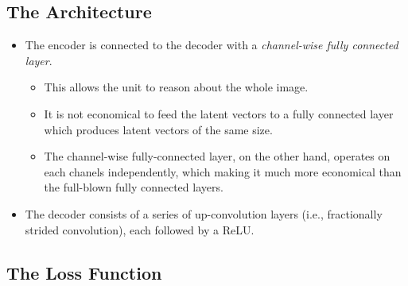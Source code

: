 \documentclass[10pt]{article}
\begin{document}
  \subsection{The Architecture}

  \begin{itemize}
  	
  	\item The encoder is connected to the decoder with a \emph{channel-wise fully connected layer}.
  	\begin{itemize}
  		\item This allows the unit to reason about the whole image.

  		\item It is not economical to feed the latent vectors to a fully connected layer which produces latent vectors of the same size. 

  		\item The channel-wise fully-connected layer, on the other hand, operates on each chanels independently, which making it much more economical than the full-blown fully connected layers.
  	\end{itemize}

  	\item The decoder consists of a series of up-convolution layers (i.e., fractionally strided convolution), each followed by a ReLU.	
  \end{itemize}

  \subsection{The Loss Function}
\end{document}
